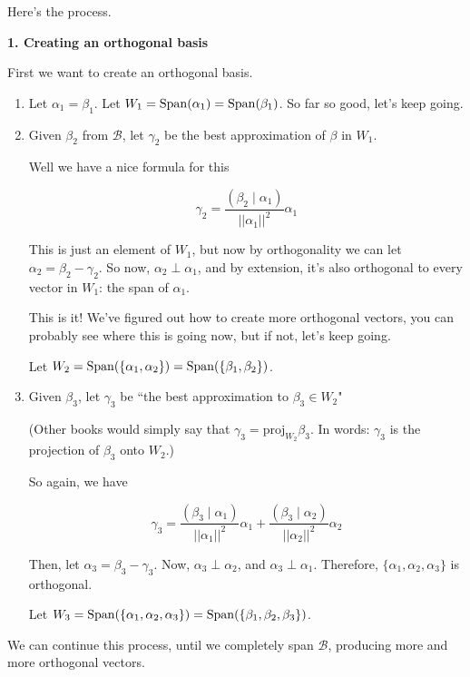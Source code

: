 \documentclass[12pt]{article}
\def\proj{\text{proj}}
\def\B{\mathcal B}
\newcommand{\ip}[2]{\left( #1 \mid #2 \right)}
\begin{document}
  Here's the process.

  {\bf 1. Creating an orthogonal basis}

  First we want to create an orthogonal basis.

  \begin{enumerate}
    \item Let $\alpha_1 = \beta_1$. Let $W_1 = \mathrm{Span}(\alpha_1) =
      \mathrm{Span}(\beta_1)$. So far so good, let's keep going.

    \item Given $\beta_2$ from $\B$, let $\gamma_2$ be the best approximation of
      $\beta$ in $W_1$. 

      Well we have a nice formula for this

      \[
        \gamma_2 = \frac{\ip{\beta_2}{\alpha_1}}{||\alpha_1||^2} \alpha_1
      \]

      This is just an element of $W_1$, but now by orthogonality we can let
      $\alpha_2 = \beta_2 - \gamma_2$. So now, $\alpha_2 \perp \alpha_1$, and by
      extension, it's also orthogonal to every vector in $W_1$: the span of
      $\alpha_1$.

      This is it! We've figured out how to create more orthogonal vectors, you
      can probably see where this is going now, but if not, let's keep going.

      Let $W_2 = \mathrm{Span}(\{\alpha_1, \alpha_2\}) = \mathrm{Span}(\{\beta_1, \beta_2\})$.

    \item Given $\beta_3$, let $\gamma_3$ be ``the best approximation to
      $\beta_3 \in W_2$"

      (Other books would simply say that $\gamma_3 = \proj_{W_2} \beta_3$. In
      words: $\gamma_3$ is the projection of $\beta_3$ onto $W_2$.)
      
      So again, we have

      \[
        \gamma_3 = \frac{\ip{\beta_3}{\alpha_1}}{||\alpha_1||^2} \alpha_1 +
        \frac{\ip{\beta_3}{\alpha_2}}{||\alpha_2||^2} \alpha_2
      \]

      Then, let $\alpha_3 = \beta_3 - \gamma_3$. Now, $\alpha_3 \perp \alpha_2$,
      and $\alpha_3 \perp \alpha_1$. Therefore, $\{\alpha_1, \alpha_2,
      \alpha_3\}$ is orthogonal.

      Let $W_3 = \mathrm{Span}(\{\alpha_1, \alpha_2, \alpha_3\}) = \mathrm{Span}(\{\beta_1,
      \beta_2, \beta_3\})$.
  \end{enumerate}

  We can continue this process, until we completely span $\B$, producing more
  and more orthogonal vectors.
\end{document}
